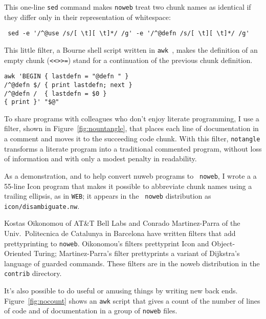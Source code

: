 \documentclass{article}
\begin{document}
{\hfuzz=6.8pt
This one-line {\tt sed} command makes {\tt noweb} treat two chunk names as
identical if they differ only in their representation of whitespace:
\begin{verbatim}
 sed -e '/^@use /s/[ \t][ \t]*/ /g' -e '/^@defn /s/[ \t][ \t]*/ /g'
\end{verbatim}
\par}

This little filter, a Bourne shell script
written in {\tt awk}~\cite{aho:awk},
makes the definition of an empty chunk (\verb+<<>>=+)
stand for a continuation of the previous chunk definition.
\begin{verbatim}
awk 'BEGIN { lastdefn = "@defn " }
/^@defn $/ { print lastdefn; next }
/^@defn /  { lastdefn = $0 }
{ print }' "$@"
\end{verbatim}



To share programs with colleagues who don't enjoy literate
programming, I use a filter, shown in Figure~\ref{fig:nountangle}, that
places each line of documentation in a comment and moves it to
the succeeding code chunk.
With this filter, \verb+notangle+
transforms a literate 
program into a traditional commented program, without loss of
information and with only a modest penalty in readability.


As a demonstration, and to help convert nuweb programs to {\tt
noweb}, I wrote a
a 55-line Icon program that makes it possible to abbreviate chunk names
using a trailing ellipsis, as in {\tt WEB}; it appears in the {\tt
noweb} distribution as
\verb+icon/disambiguate.nw+. 

Kostas Oikonomou of AT\&T Bell Labs and Conrado Martinez-Parra of 
the Univ.\ Politecnica de Catalunya in Barcelona have written filters
that add prettyprinting to {\tt noweb}.
Oikonomou's filters prettyprint Icon and Object-Oriented Turing;
Martinez-Parra's filter prettyprints a variant of Dijkstra's language
of guarded commands.
These filters are in the noweb distribution in the \verb+contrib+ directory.

It's also possible to do useful or amusing things by writing new back
ends.
Figure~\ref{fig:nocount} shows an {\tt awk} script that gives a count of the
number of lines of code and of documentation in a group of {\tt noweb}
files.
\end{document}
